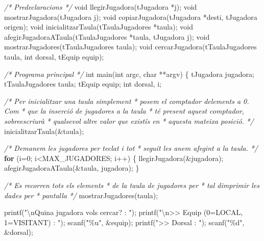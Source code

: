 \documentclass[]{book}
\newenvironment{Shaded}{\begin{snugshade}}{\end{snugshade}}
\newcommand{\CommentTok}[1]{\textcolor[rgb]{0.56,0.35,0.01}{\textit{#1}}}
\newcommand{\ControlFlowTok}[1]{\textcolor[rgb]{0.13,0.29,0.53}{\textbf{#1}}}
\newcommand{\DataTypeTok}[1]{\textcolor[rgb]{0.13,0.29,0.53}{#1}}
\newcommand{\DecValTok}[1]{\textcolor[rgb]{0.00,0.00,0.81}{#1}}
\newcommand{\NormalTok}[1]{#1}
\newcommand{\SpecialCharTok}[1]{\textcolor[rgb]{0.00,0.00,0.00}{#1}}
\newcommand{\StringTok}[1]{\textcolor[rgb]{0.31,0.60,0.02}{#1}}
\begin{document}
\begin{Shaded}
\begin{Highlighting}[]
\CommentTok{/* Predeclaracions */}
\DataTypeTok{void}\NormalTok{ llegirJugadora(tJugadora *j);}
\DataTypeTok{void}\NormalTok{ mostrarJugadora(tJugadora j);}
\DataTypeTok{void}\NormalTok{ copiarJugadora(tJugadora *desti, tJugadora origen);}
\DataTypeTok{void}\NormalTok{ inicialitzarTaula(tTaulaJugadores *taula);}
\DataTypeTok{void}\NormalTok{ afegirJugadoraATaula(tTaulaJugadores *taula, tJugadora j);}
\DataTypeTok{void}\NormalTok{ mostrarJugadores(tTaulaJugadores taula);}
\DataTypeTok{void}\NormalTok{ cercarJugadora(tTaulaJugadores taula, }\DataTypeTok{int}\NormalTok{ dorsal, tEquip equip);}

\CommentTok{/* Programa principal */}
\DataTypeTok{int}\NormalTok{ main(}\DataTypeTok{int}\NormalTok{ argc, }\DataTypeTok{char}\NormalTok{ **argv) \{}
\NormalTok{    tJugadora jugadora;}
\NormalTok{    tTaulaJugadores taula;}
\NormalTok{    tEquip equip;}
    \DataTypeTok{int}\NormalTok{ dorsal, i;}
    
    \CommentTok{/* Per inicialitzar una taula simplement}
\CommentTok{     * posem el comptador d\textquotesingle{}elements a 0. Com}
\CommentTok{     * que la inserció de jugadores a la taula}
\CommentTok{     * té present aquest comptador, sobreescriurà}
\CommentTok{     * qualsevol altre valor que existís en }
\CommentTok{     * aquesta mateixa posició.}
\CommentTok{     */}
\NormalTok{    inicialitzarTaula(\&taula);}
    
    \CommentTok{/* Demanem les jugadores per teclat i tot}
\CommentTok{     * seguit les anem afegint a la taula.}
\CommentTok{     */}
    \ControlFlowTok{for}\NormalTok{ (i=}\DecValTok{0}\NormalTok{; i\textless{}MAX\_JUGADORES; i++) \{}
\NormalTok{        llegirJugadora(\&jugadora);}
\NormalTok{        afegirJugadoraATaula(\&taula, jugadora);}
\NormalTok{    \}}
    
    \CommentTok{/* Es recorren tots els elements}
\CommentTok{     * de la taula de jugadores per}
\CommentTok{     * tal d\textquotesingle{}imprimir les dades per }
\CommentTok{     * pantalla}
\CommentTok{     */}
\NormalTok{    mostrarJugadores(taula);}
    
\NormalTok{    printf(}\StringTok{"}\SpecialCharTok{\textbackslash{}n}\StringTok{Quina jugadora vols cercar? : "}\NormalTok{);}
\NormalTok{    printf(}\StringTok{"}\SpecialCharTok{\textbackslash{}n}\StringTok{\textgreater{}\textgreater{} Equip (0=LOCAL, 1=VISITANT) : "}\NormalTok{);}
\NormalTok{    scanf(}\StringTok{"\%u"}\NormalTok{, \&equip);}
\NormalTok{    printf(}\StringTok{"\textgreater{}\textgreater{} Dorsal : "}\NormalTok{);}
\NormalTok{    scanf(}\StringTok{"\%d"}\NormalTok{, \&dorsal);}
    

\end{Highlighting}
\end{Shaded}
\end{document}
